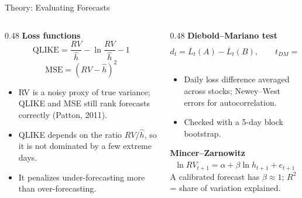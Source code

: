 \documentclass[aspectratio=169, 10pt]{beamer}
\begin{document}
\begin{frame}{Theory: Evaluating Forecasts}
    \begin{columns}[T]
        \begin{column}{0.48\textwidth}
            \textbf{Loss functions}
            $$\text{QLIKE} = \frac{RV}{\hat h} - \ln\frac{RV}{\hat h} - 1$$
            $$\text{MSE} = (RV - \hat h)^2$$
            \small
            \begin{itemize}
                \item RV is a noisy proxy of true variance; QLIKE and MSE still rank forecasts correctly (Patton, 2011).
                \item QLIKE depends on the ratio $RV/\hat h$, so it is not dominated by a few extreme days.
                \item It penalizes under-forecasting more than over-forecasting.
            \end{itemize}
        \end{column}
        \begin{column}{0.48\textwidth}
            \textbf{Diebold--Mariano test}
            $$d_t = \overline{L}_t(A) - \overline{L}_t(B),\qquad t_{DM} = \frac{\bar d}{\widehat{se}_{NW}(\bar d)}$$
            \small
            \begin{itemize}
                \item Daily loss difference averaged across stocks; Newey--West errors for autocorrelation.
                \item Checked with a 5-day block bootstrap.
            \end{itemize}
            \normalsize
            \textbf{Mincer--Zarnowitz}
            $$\ln RV_{t+1} = \alpha + \beta \ln \hat h_{t+1} + e_{t+1}$$
            \small A calibrated forecast has $\beta\approx 1$; $R^2$ = share of variation explained.
        \end{column}
    \end{columns}
\end{frame}
\end{document}
